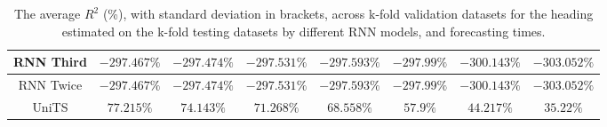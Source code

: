 \begin{table}[!ht]
{\begin{tabular}{|c|c|c|c|c|c|c|c|}
			RNN Third & $-297.467\%$ & $-297.474\%$ & $-297.531\%$ & $-297.593\%$ & $-297.99\%$ & $-300.143\%$ & $-303.052\%$ \\ \hline
			RNN Twice & $-297.467\%$ & $-297.474\%$ & $-297.531\%$ & $-297.593\%$ & $-297.99\%$ & $-300.143\%$ & $-303.052\%$ \\ \hline
			UniTS & $77.215\%$ & $74.143\%$ & $71.268\%$ & $\mathbf{68.558\%}$ & $\mathbf{57.9\%}$ & $\mathbf{44.217\%}$ & $\mathbf{35.22\%}$ \\ \hline
		\end{tabular}
	}
	\caption{The average $R^{2}$ (\%), with standard deviation in brackets, across k-fold validation datasets for the heading estimated on the k-fold testing datasets by different RNN models, and forecasting times.}
	\label{tab:all_direction_R2}
\end{table}